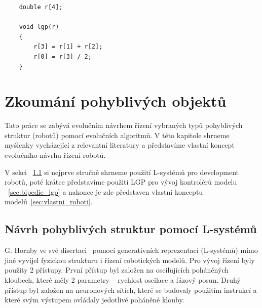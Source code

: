 
\begin{lstlisting}
    double r[4];

    void lgp(r)
    {
        r[3] = r[1] + r[2];
        r[0] = r[3] / 2;
    }
\end{lstlisting}


\chapter{Zkoumání pohyblivých objektů}
\label{chap:zkoumani_pohyblivych_objektu}

Tato práce se zabývá evolučním návrhem řízení vybraných typů pohyblivých struktur (robotů) pomocí evolučních algoritmů.
V této kapitole shrneme myšlenky vycházející z relevantní literatury a představíme vlastní koncept evolučního návrhu řízení robotů.

V sekci ~\ref{sec:l_systemy} si nejprve stručně shrneme použití L-systémů pro development robotů, poté krátce představíme použití LGP pro vývoj kontrolérů modelu ~\ref{sec:bipedie_lgp} a nakonec je zde představen vlastní konceptu modelů~\ref{sec:vlastni_roboti}.

\section{Návrh pohyblivých struktur pomocí L-systémů}
\label{sec:l_systemy}

G. Hornby ve své disertaci~\cite{Hornby2003} pomocí generativních reprezentací (L-systémů) mimo jiné vyvíjel fyzickou strukturu i řízení robotických modelů.
Pro vývoj řízení byly použity 2 přístupy.
První přístup byl založen na oscilujících poháněných kloubech, které měly 2 parametry -- rychlost oscilace a fázový posun.
Druhý přístup byl založen na neuronových sítích, které se budovaly použitím instrukcí a které svým výstupem ovládaly jedotlivé poháněné klouby.

